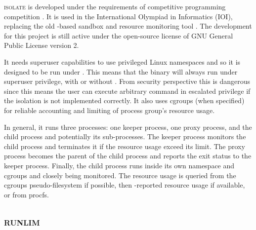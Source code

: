 \textsc{isolate} \citep{SandboxSecurelyExecuting2019} is developed under the requirements of competitive programming competition \citep{marevs2012new}.
It is used in the International Olympiad in Informatics (IOI), replacing the old -based sandbox and resource monitoring tool \citep{maggioloCMSGrowingGrading2014}.
The development for this project is still active under the open-source license of GNU General Public License version 2.

It needs superuser capabilities to use privileged Linux namespaces and so it is designed to be run under .
This means that the binary will always run under superuser privilege, with or without .
From security perspective this is dangerous since this means the user can execute arbitrary command in escalated privilege if the isolation is not implemented correctly.
It also uses cgroups (when specified) for reliable accounting and limiting of process group's resource usage.

In general, it runs three processes: one keeper process, one proxy process, and the child process and potentially its sub-processes.
The keeper process monitors the child process and terminates it if the resource usage exceed its limit.
The proxy process becomes the parent of the child process and reports the exit status to the keeper process.
Finally, the child process runs inside its own namespace and cgroups and closely being monitored.
The resource usage is queried from the cgroups pseudo-filesystem if possible, then -reported resource usage if available, or from procfs.


\subsection{\textsc{runlim}}


